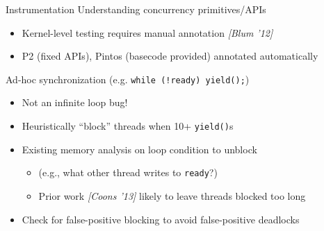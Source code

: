 \documentclass[xcolor=dvipsnames]{beamer}
\begin{document}
\begin{frame}{Instrumentation}
	Understanding concurrency primitives/APIs
	\begin{itemize}
		\item Kernel-level testing requires manual annotation {\em [Blum '12]}
		\item P2 (fixed APIs), Pintos (basecode provided) annotated automatically
	\end{itemize}
	\pause
	\linegap

	Ad-hoc synchronization (e.g. {\tt while (!ready) yield();})
	\begin{itemize}
		\item Not an infinite loop bug!
		\item Heuristically ``block'' threads when 10+ {\tt yield()}s %
		\item Existing memory analysis %
			on loop condition to unblock
			\begin{itemize}
				\item (e.g., what other thread writes to {\tt ready}?)
				\item Prior work {\em [Coons '13]} likely to leave threads blocked too long
			\end{itemize}
		\item Check for false-positive blocking to avoid false-positive deadlocks
	\end{itemize}



\end{frame}

\end{document}
